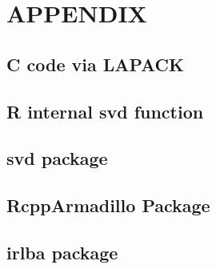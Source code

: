 \documentclass[12pt]{article}
\begin{document}
\newpage
\vskip 0.2in

\nocite{halko2011finding, hastie2015statistical, bruck1975iterative, mazumder2010spectral, oh2015fast, wong2015matrix, nesterov2007gradient, beck2009fast}


\newpage
\section*{APPENDIX}
\subsection*{C code via LAPACK}
	
\subsection*{R internal svd function}
	
\subsection*{svd package}

\subsection*{RcppArmadillo Package}

\subsection*{irlba package}

\end{document}
